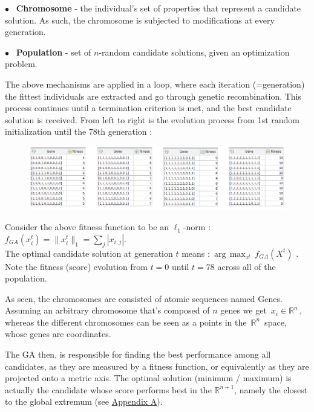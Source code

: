 \documentclass[12pt]{article}
\numberwithin{equation}{section}
\begin{document}
\begin{flushleft}
$\bullet$ \ \textbf{Chromosome} - the individual's set of properties that represent a candidate solution. As such, the chromosome is subjected to modifications at every generation.

$\bullet$ \ \textbf{Population} - set of $n$-random candidate solutions, given an optimization problem.

The above mechanisms are applied in a loop, where each iteration (=generation) the fittest individuals are extracted and go through genetic recombination. This process continues until a termination criterion is met, and the best candidate solution is received. From left to right is the evolution process from 1st random initialization until the 78th generation : \vspace{5mm}

\begin{figure}[H]
\centering
\includegraphics[width=1.13\linewidth, center]{performance.png}
\end{figure}
Consider the above fitness function to be an $\ell_1$-norm \hspace{0.75mm} : \,$f_{GA}(x_{i}^t) = \| x_i^t \|_1 = \sum_j | x_{i,j} |$. \\ The optimal candidate solution at generation $t$ means  : \,$\text{arg} \, \max_{x^t} \, f_{GA}(X^t)$ . \\
Note the fitness (score) evolution from $t=0$ until $t=78$ across all of the population.

As seen, the chromosomes are consisted of atomic sequences named Genes. Assuming an arbitrary chromosome that's composed of $n$ genes we get \,$x_i \in \mathbb{R}^n$\,, \,whereas the different chromosomes can be seen as a points in the \,$\mathbb{R}^{n}$\, space, whose genes are coordinates. 

The GA then, is responsible for finding the best performance among all candidates, as they are measured by a fitness function, or equivalently as they are projected onto a metric axis. The optimal solution (minimum / maximum) is actually the candidate whose score performs best in the $\mathbb{R}^{n+1}$, namely the closest to the global extremum (see \hyperlink{app_extremum}{Appendix A}).


\end{flushleft}
\end{document}
